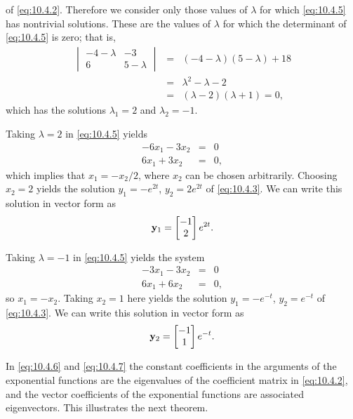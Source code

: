 \documentclass{ximera}
\begin{document}
of \eqref{eq:10.4.2}. Therefore we consider only those values of $\lambda$
for which \eqref{eq:10.4.5} has nontrivial solutions. These are the values
of $\lambda$ for which the determinant of \eqref{eq:10.4.5} is zero;   that
is,
\begin{eqnarray*}
\begin{vmatrix}-4-\lambda&-3\\6&5-\lambda\end{vmatrix}&=&
(-4-\lambda)(5-\lambda)+18\\&=&\lambda^2-\lambda-2\\
&=&(\lambda-2)(\lambda+1)=0,
\end{eqnarray*}
which has the solutions $\lambda_1=2$ and $\lambda_2=-1$.

Taking $\lambda=2$ in  \eqref{eq:10.4.5} yields
\begin{eqnarray*}
-6 x_1-3 x_2&=&0\\
6 x_1+3 x_2&=&0,
\end{eqnarray*}
which implies that $x_1=-x_2/2$, where  $x_2$ can be
chosen arbitrarily. Choosing
$x_2=2$ yields the solution $y_1=-e^{2t}$,
$y_2=2e^{2t}$ of  \eqref{eq:10.4.3}. We can write this solution in vector
form as
\begin{equation}\label{eq:10.4.6}
{\bf y}_1=\begin{bmatrix} -1\\2\end{bmatrix} e^{2t}.
\end{equation}

Taking $\lambda=-1$ in  \eqref{eq:10.4.5} yields the system
\begin{eqnarray*}
-3 x_1-3 x_2&=&0\\
6 x_1+6 x_2&=&0,
\end{eqnarray*}
so $x_1=-x_2$. Taking $x_2=1$ here
yields the solution $y_1=-e^{-t}$, $y_2=e^{-t}$ of  \eqref{eq:10.4.3}. We
can write this solution in vector form as
\begin{equation}\label{eq:10.4.7}
{\bf y}_2=\begin{bmatrix}-1\\1\end{bmatrix}e^{-t}.
\end{equation}

In \eqref{eq:10.4.6} and \eqref{eq:10.4.7} the constant coefficients in the
arguments of the exponential functions are the eigenvalues of the
coefficient matrix in \eqref{eq:10.4.2}, and the vector coefficients of the
exponential functions are associated eigenvectors. This illustrates
the next theorem.
\end{document}
